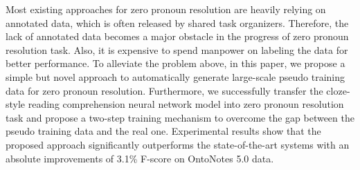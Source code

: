 Most existing approaches for zero pronoun resolution are heavily relying on annotated data, which is often released by shared task organizers. Therefore, the lack of annotated data becomes a major obstacle in the progress of zero pronoun resolution task. Also, it is expensive to spend manpower on labeling the data for better performance. To alleviate the problem above, in this paper, we propose a simple but novel approach to automatically generate large-scale pseudo training data for zero pronoun resolution. Furthermore, we successfully transfer the cloze-style reading comprehension neural network model into zero pronoun resolution task and propose a two-step training mechanism to overcome the gap between the pseudo training data and the real one. Experimental results show that the proposed approach significantly outperforms the state-of-the-art systems with an absolute improvements of 3.1\% F-score on OntoNotes 5.0 data.
